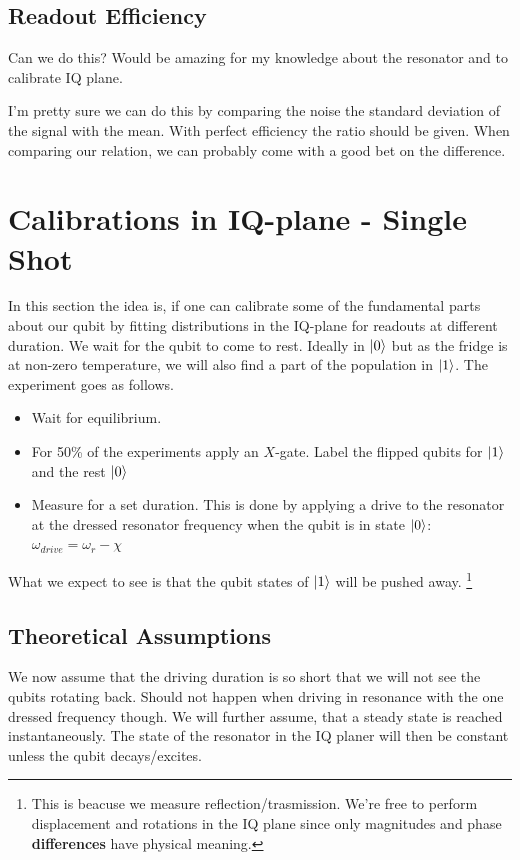 \subsection{Readout Efficiency}
Can we do this? Would be amazing for my knowledge about the resonator and to calibrate IQ plane.

I'm pretty sure we can do this by comparing the noise the standard deviation of the signal with the mean. With perfect efficiency the ratio should be given. When comparing our relation, we can probably come with a good bet on the difference.

\section{Calibrations in IQ-plane - Single Shot}
In this section the idea is, if one can calibrate some of the fundamental parts about our qubit by fitting distributions in the IQ-plane for readouts at different duration. We wait for the qubit to come to rest. Ideally in $\ket{0}$ but as the fridge is at non-zero temperature, we will also find a part of the population in $\ket{1}$. The experiment goes as follows.
\begin{itemize}
    \item Wait for equilibrium.
    \item For 50\% of the experiments apply an $X$-gate. Label the flipped qubits for $\ket{1}$ and the rest $\ket{0}$
    \item Measure for a set duration. This is done by applying a drive to the resonator at the dressed resonator frequency when the qubit is in state $\ket{0}$: $\omega_{drive} = \omega_r - \chi$
\end{itemize}
What we expect to see is that the qubit states of $\ket{1}$ will be pushed away. \footnote{This is beacuse we measure reflection/trasmission. We're free to perform displacement and rotations in the IQ plane since only magnitudes and phase \textbf{differences} have physical meaning.} 

\subsection{Theoretical Assumptions}
We now assume that the driving duration is so short that we will not see the qubits rotating back. Should not happen when driving in resonance with the one dressed frequency though. We will further assume, that a steady state is reached instantaneously. The state of the resonator in the IQ planer will then be constant unless the qubit decays/excites. 


